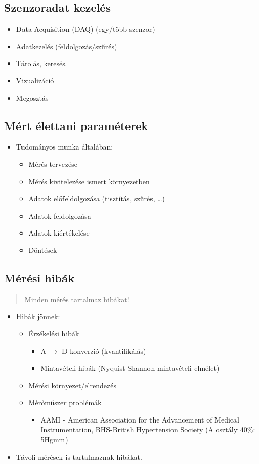 \subsection{Szenzoradat kezelés}
\begin{itemize}
    \item Data Acquisition (DAQ) (egy/több szenzor)
    \item Adatkezelés (feldolgozás/szűrés)
    \item Tárolás, keresés
    \item Vizualizáció
    \item Megosztás
\end{itemize}

\subsection{Mért élettani paraméterek}
\begin{itemize}
    \item Tudományos munka általában:
    \begin{itemize}
        \item Mérés tervezése
        \item Mérés kivitelezése ismert környezetben
        \item Adatok előfeldolgozása (tisztítás, szűrés, \dots)
        \item Adatok feldolgozása
        \item Adatok kiértékelése
        \item Döntések
    \end{itemize}
\end{itemize}

\subsection{Mérési hibák}
\begin{quote}
    Minden mérés tartalmaz hibákat!
\end{quote}
\begin{itemize}
    \item Hibák jönnek:
    \begin{itemize}
        \item Érzékelési hibák
        \begin{itemize}
            \item A $\rightarrow$ D konverzió (kvantifikálás)
            \item Mintavételi hibák (Nyquist-Shannon mintavételi elmélet)
        \end{itemize}
        \item Mérési környezet/elrendezés
        \item Mérőműszer problémák
        \begin{itemize}
            \item AAMI - American Association for the Advancement of Medical Instrumentation, BHS-British Hypertension Society (A osztály 40\%: 5Hgmm)
        \end{itemize}
    \end{itemize}
    \item Távoli mérések is tartalmaznak hibákat.
\end{itemize}

